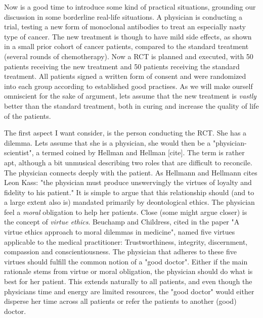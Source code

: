 \documentclass[12p]{article}
\begin{document}
Now is a good time to introduce some kind of practical situations, grounding our discussion in some borderline real-life situations.
A physician is conducting a trial, testing a new form of monoclonal antibodies to treat an especially nasty type of cancer.
The new treatment is though to have mild side effects, as shown in a small prior cohort of cancer patients, compared to the standard treatment (several rounds of chemotherapy).
Now a RCT is planned and executed, with 50 patients receiving the new treatment and 50 patients receiving the standard treatment.
All patients signed a written form of consent and were randomized into each group according to established good practises.
As we will make ourself omniscient for the sake of argument, lets assume that the new treatment is \emph{vastly} better than the standard treatment, both in curing and increase the quality of life of the patients.




The first aspect I want consider, is the person conducting the RCT.
She has a dilemma.
Lets assume that she is a physician, she would then be a "physician-scientist", a termed coined by Hellman and Hellman [cite].
The term is rather apt, although a bit unmusical describing two roles that are difficult to reconcile.
The physician connects deeply with the patient.
As Hellmann and Hellmann cites Leon Kass: "the physician must produce unswervingly the virtues of loyalty and fidelity to his patient."
It is simple to argue that this relationship should (and to a large extent also is) mandated primarily by deontological ethics.
The physician feel a \emph{moral} obligation to help her patients.
Close (some might argue closer) is the concept of \emph{virtue ethics}.
Beuchamp and Childress, cited in the paper "A virtue ethics approach to moral dilemmas in medicine", named five virtues applicable to the medical practitioner:
Trustworthiness, integrity, discernment, compassion and conscientiousness.
The physician that adheres to these five virtues should fulfill the common notion of a "good doctor".
Either if the main rationale stems from virtue or moral obligation, the physician should do what is best for her patient.
This extends naturally to all patients, and even though the physicians time and energy are limited resources, the "good doctor" would either disperse her time across all patients or refer the patients to another (good) doctor.
\end{document}
